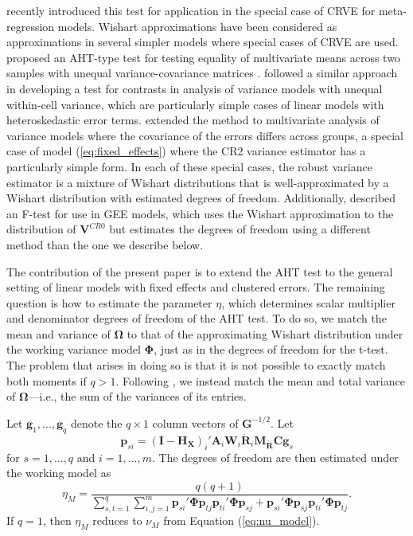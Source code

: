 \documentclass[12pt]{article}
\newcommand{\bm}{\mathbf}
\newcommand{\bs}{\boldsymbol}
\begin{document}
\citet{Tipton2015small-F} recently introduced this test for application in the special case of CRVE for meta-regression models.
Wishart approximations have been considered as approximations in several simpler models where special cases of CRVE are used.
\citet{Nel1986solution} proposed an AHT-type test for testing equality of multivariate means across two samples with unequal variance-covariance matrices \citep[i.e., the multivariate Behrens-Fisher problem; see also][]{Krishnamoorthy2004modified}.
\citet{Zhang2012twowayANOVA} followed a similar approach in developing a test for contrasts in analysis of variance models with unequal within-cell variance, which are particularly simple cases of linear models with heteroskedastic error terms. 
\citet{Zhang2012MANOVA} extended the method to multivariate analysis of variance models where the covariance of the errors differs across groups, a special case of model (\ref{eq:fixed_effects}) where the CR2 variance estimator has a particularly simple form. 
In each of these special cases, the robust variance estimator is a mixture of Wishart distributions that is well-approximated by a Wishart distribution with estimated degrees of freedom.
Additionally, \citet{Pan2002small} described an F-test for use in GEE models, which uses the Wishart approximation to the distribution of $\bm{V}^{CR0}$ but estimates the degrees of freedom using a different method than the one we describe below.

The contribution of the present paper is to extend the AHT test to the general setting of linear models with fixed effects and clustered errors. 
The remaining question is how to estimate the parameter $\eta$, which determines scalar multiplier and denominator degrees of freedom of the AHT test. 
To do so, we match the mean and variance of $\bs\Omega$ to that of the approximating Wishart distribution under the working variance model $\bs\Phi$, just as in the degrees of freedom for the t-test. 
The problem that arises in doing so is that it is not possible to exactly match both moments if $q > 1$.
Following \citet{Tipton2015small-F}, we instead match the mean and total variance of $\bs\Omega$---i.e., the sum of the variances of its entries.

Let $\bm{g}_1,...,\bm{g}_q$ denote the $q \times 1$ column vectors of $\bm{G}^{-1/2}$. 
Let \[
\bm{p}_{si} = \left(\bm{I} - \bm{H_X}\right)_i' \bm{A}_i \bm{W}_i \bm{\ddot{R}}_i \bm{M_{\ddot{R}}}\bm{C} \bm{g}_s \]
for $s = 1,...,q$ and $i = 1,...,m$. 
The degrees of freedom are then estimated under the working model as
\begin{equation}
\label{eq:eta_model}
\eta_M = \frac{q(q + 1)}{\sum_{s,t=1}^q \sum_{i,j=1}^m \bm{p}_{si}'\bs\Phi\bm{p}_{tj} \bm{p}_{ti}'\bs\Phi\bm{p}_{sj} + \bm{p}_{si}'\bs\Phi\bm{p}_{sj} \bm{p}_{ti}'\bs\Phi\bm{p}_{tj}}.
\end{equation}
If $q = 1$, then $\eta_M$ reduces to $\nu_M$ from Equation (\ref{eq:nu_model}).
\end{document}
